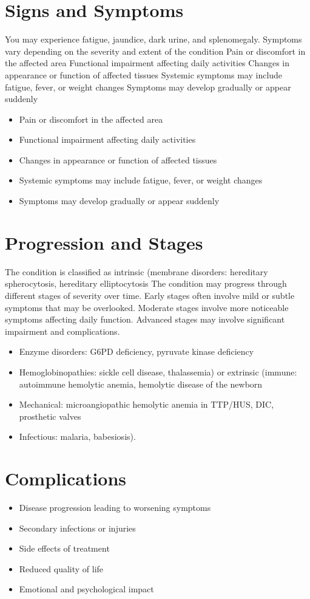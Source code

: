 \section{Signs and Symptoms}
You may experience fatigue, jaundice, dark urine, and splenomegaly. Symptoms vary depending on the severity and extent of the condition Pain or discomfort in the affected area Functional impairment affecting daily activities Changes in appearance or function of affected tissues Systemic symptoms may include fatigue, fever, or weight changes Symptoms may develop gradually or appear suddenly

\begin{itemize}[noitemsep]
  \item Pain or discomfort in the affected area
  \item Functional impairment affecting daily activities
  \item Changes in appearance or function of affected tissues
  \item Systemic symptoms may include fatigue, fever, or weight changes
  \item Symptoms may develop gradually or appear suddenly
\end{itemize}
\section{Progression and Stages}
The condition is classified as intrinsic (membrane disorders: hereditary spherocytosis, hereditary elliptocytosis The condition may progress through different stages of severity over time. Early stages often involve mild or subtle symptoms that may be overlooked. Moderate stages involve more noticeable symptoms affecting daily function. Advanced stages may involve significant impairment and complications.

\begin{itemize}[noitemsep]
  \item Enzyme disorders: G6PD deficiency, pyruvate kinase deficiency
  \item Hemoglobinopathies: sickle cell disease, thalassemia) or extrinsic (immune: autoimmune hemolytic anemia, hemolytic disease of the newborn
  \item Mechanical: microangiopathic hemolytic anemia in TTP/HUS, DIC, prosthetic valves
  \item Infectious: malaria, babesiosis).
\end{itemize}
\section{Complications}
\begin{itemize}[noitemsep]
  \item Disease progression leading to worsening symptoms
  \item Secondary infections or injuries
  \item Side effects of treatment
  \item Reduced quality of life
  \item Emotional and psychological impact
\end{itemize}

